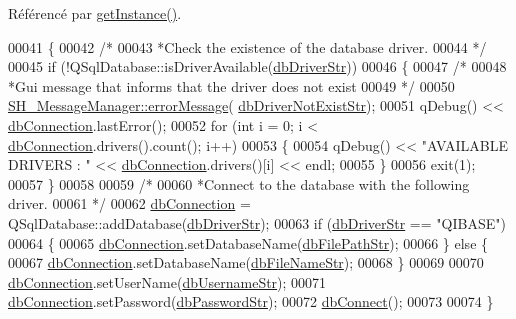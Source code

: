 Référencé par \hyperlink{classSH__DatabaseManager_a31198eb4de0f8b18e3fa0eed09f24d19}{get\-Instance()}.


\begin{DoxyCode}
00041 \{
00042     \textcolor{comment}{/*}
00043 \textcolor{comment}{     *Check the existence of the database driver.
}
00044 \textcolor{comment}{     */}
00045     \textcolor{keywordflow}{if} (!QSqlDatabase::isDriverAvailable(\hyperlink{SH__DatabaseManager_8h_a867ada6d1926e2ded0e68678e02a19c7}{dbDriverStr}))
00046     \{
00047         \textcolor{comment}{/*}
00048 \textcolor{comment}{        *Gui message that informs that the driver does not exist
}
00049 \textcolor{comment}{        */}
00050         \hyperlink{classSH__MessageManager_a0cb4f06cf67539457482ba1c8544eb06}{SH\_MessageManager::errorMessage}(
      \hyperlink{SH__DatabaseManager_8h_adeeb3449586b533bdd3cd5938d501807}{dbDriverNotExistStr});
00051         qDebug() << \hyperlink{classSH__DatabaseManager_a9291f61c3abbba2c4f1567b1d8325f0e}{dbConnection}.lastError();
00052         \textcolor{keywordflow}{for} (\textcolor{keywordtype}{int} i = 0; i < \hyperlink{classSH__DatabaseManager_a9291f61c3abbba2c4f1567b1d8325f0e}{dbConnection}.drivers().count(); i++)
00053         \{
00054             qDebug() << \textcolor{stringliteral}{"AVAILABLE DRIVERS : "} << \hyperlink{classSH__DatabaseManager_a9291f61c3abbba2c4f1567b1d8325f0e}{dbConnection}.drivers()[i] << endl;
00055         \}
00056         exit(1);
00057     \}
00058 
00059     \textcolor{comment}{/*}
00060 \textcolor{comment}{    *Connect to the database with the following driver.
}
00061 \textcolor{comment}{    */}
00062     \hyperlink{classSH__DatabaseManager_a9291f61c3abbba2c4f1567b1d8325f0e}{dbConnection} = QSqlDatabase::addDatabase(\hyperlink{SH__DatabaseManager_8h_a867ada6d1926e2ded0e68678e02a19c7}{dbDriverStr});
00063     \textcolor{keywordflow}{if} (\hyperlink{SH__DatabaseManager_8h_a867ada6d1926e2ded0e68678e02a19c7}{dbDriverStr} == \textcolor{stringliteral}{"QIBASE"})
00064     \{
00065         \hyperlink{classSH__DatabaseManager_a9291f61c3abbba2c4f1567b1d8325f0e}{dbConnection}.setDatabaseName(\hyperlink{SH__DatabaseManager_8h_acee79beb6e5aec996fd46b84264d072a}{dbFilePathStr});
00066     \} \textcolor{keywordflow}{else} \{
00067         \hyperlink{classSH__DatabaseManager_a9291f61c3abbba2c4f1567b1d8325f0e}{dbConnection}.setDatabaseName(\hyperlink{SH__DatabaseManager_8h_a6c6a636455d1d86d7215a52de4bc6828}{dbFileNameStr});
00068     \}
00069 
00070     \hyperlink{classSH__DatabaseManager_a9291f61c3abbba2c4f1567b1d8325f0e}{dbConnection}.setUserName(\hyperlink{SH__DatabaseManager_8h_a15964752bd7d7c2075f3bafca2218411}{dbUsernameStr});
00071     \hyperlink{classSH__DatabaseManager_a9291f61c3abbba2c4f1567b1d8325f0e}{dbConnection}.setPassword(\hyperlink{SH__DatabaseManager_8h_a5dbd4602b69f5a87243d49f9c873ac64}{dbPasswordStr});
00072     \hyperlink{classSH__DatabaseManager_ab634ce39ef483e7ad2fe08d4b8ba74f7}{dbConnect}();
00073 
00074 \}
\end{DoxyCode}


